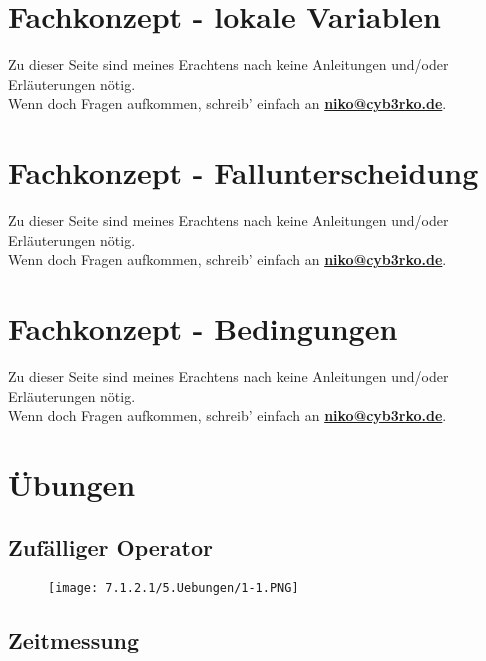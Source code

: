 \documentclass{scrartcl}   %
\begin{document}
\newpage

\section{Fachkonzept - lokale Variablen}

Zu dieser Seite sind meines Erachtens nach keine Anleitungen und/oder Erläuterungen nötig.\\
Wenn doch Fragen aufkommen, schreib' einfach an \textbf{\href{mailto:niko@cyb3rko.de}{niko@cyb3rko.de}}.

\newpage

\section{Fachkonzept - Fallunterscheidung}

Zu dieser Seite sind meines Erachtens nach keine Anleitungen und/oder Erläuterungen nötig.\\
Wenn doch Fragen aufkommen, schreib' einfach an \textbf{\href{mailto:niko@cyb3rko.de}{niko@cyb3rko.de}}.

\newpage

\section{Fachkonzept - Bedingungen}

Zu dieser Seite sind meines Erachtens nach keine Anleitungen und/oder Erläuterungen nötig.\\
Wenn doch Fragen aufkommen, schreib' einfach an \textbf{\href{mailto:niko@cyb3rko.de}{niko@cyb3rko.de}}.

\newpage

\section{Übungen}

\subsection{Zufälliger Operator}

\begin{figure}[ht]
	\centering
	\texttt{[image: 7.1.2.1/5.Uebungen/1-1.PNG]}
\end{figure}

\newpage

\subsection{Zeitmessung}
\end{document}
